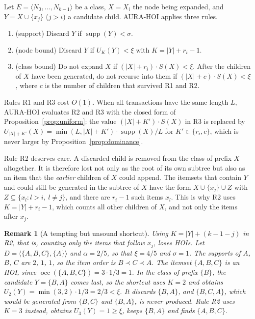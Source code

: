\documentclass[pdflatex,sn-mathphys,Numbered]{sn-jnl}
\theoremstyle{thmstyleone}
\theoremstyle{thmstyletwo}
\newtheorem{remark}{Remark}
\theoremstyle{thmstylethree}
\newcommand{\supp}{\operatorname{supp}}
\newcommand{\socc}{\operatorname{occ}}
\newcommand{\Ucap}{U}
\newcommand{\AURA}{AURA-HOI}
\begin{document}
Let $E = \langle N_0, \dots, N_{k-1} \rangle$ be a class, $X = X_i$ the node being expanded, and $Y = X \cup \{x_j\}$ ($j > i$) a candidate child. \AURA{} applies three rules.

\begin{enumerate}
\item[\textbf{R1}] (support) Discard $Y$ if $\supp(Y) < \sigma$.
\item[\textbf{R2}] (node bound) Discard $Y$ if $\Ucap_{K}(Y) < \xi$ with $K = |Y| + r_i - 1$.
\item[\textbf{R3}] (class bound) Do not expand $X$ if $(|X| + r_i) \cdot S(X) < \xi$. After the children of $X$ have been generated, do not recurse into them if $(|X| + c) \cdot S(X) < \xi$, where $c$ is the number of children that survived R1 and R2.
\end{enumerate}
Rules R1 and R3 cost $O(1)$. When all transactions have the same length $L$, \AURA{} evaluates R2 and R3 with the closed form of Proposition~\ref{prop:uniform}: the value $(|X| + K') \cdot S(X)$ in R3 is replaced by $\Ucap_{|X| + K'}(X) = \min(L, |X| + K') \cdot \supp(X) / L$ for $K' \in \{r_i, c\}$, which is never larger by Proposition~\ref{prop:dominance}.

Rule R2 deserves care. A discarded child is removed from the class of prefix $X$ altogether. It is therefore lost not only as the root of its own subtree but also as an item that the \emph{earlier} children of $X$ could append. The itemsets that contain $Y$ and could still be generated in the subtree of $X$ have the form $X \cup \{x_j\} \cup Z$ with $Z \subseteq \{x_l : l > i,\ l \ne j\}$, and there are $r_i - 1$ such items $x_l$. This is why R2 uses $K = |Y| + r_i - 1$, which counts all other children of $X$, and not only the items after $x_j$.

\begin{remark}[A tempting but unsound shortcut]\label{rem:pitfall}
Using $K = |Y| + (k - 1 - j)$ in R2, that is, counting only the items that follow $x_j$, loses HOIs. Let $D = \langle \{A,B,C\}, \{A\} \rangle$ and $\alpha = 2/5$, so that $\xi = 4/5$ and $\sigma = 1$. The supports of $A$, $B$, $C$ are $2$, $1$, $1$, so the item order is $B \prec C \prec A$. The itemset $\{A,B,C\}$ is an HOI, since $\socc(\{A,B,C\}) = 3 \cdot 1/3 = 1$. In the class of prefix $\{B\}$, the candidate $Y = \{B,A\}$ comes last, so the shortcut uses $K = 2$ and obtains $\Ucap_2(Y) = \min(3,2) \cdot 1/3 = 2/3 < \xi$. It discards $\{B,A\}$, and $\{B,C,A\}$, which would be generated from $\{B,C\}$ and $\{B,A\}$, is never produced. Rule R2 uses $K = 3$ instead, obtains $\Ucap_3(Y) = 1 \ge \xi$, keeps $\{B,A\}$ and finds $\{A,B,C\}$.
\end{remark}
\end{document}
